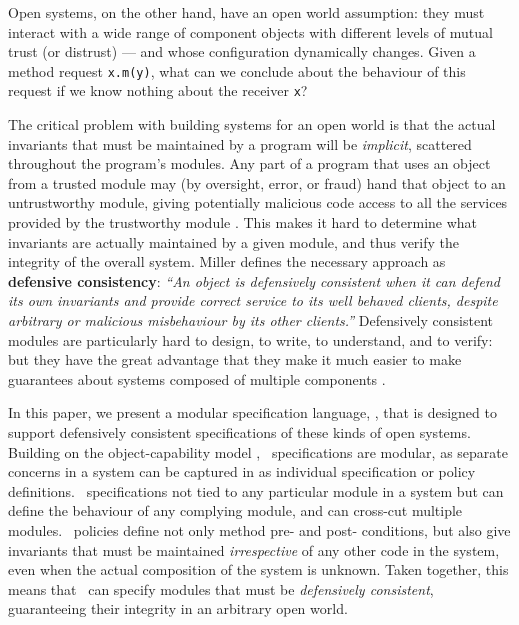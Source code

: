 Open
systems, on the other hand, have an open world assumption: they must
interact with a wide range of component objects with different levels
of mutual trust (or distrust) --- and whose configuration dynamically
changes.
%
%
Given a method request \lstinline+x.m(y)+, what can
we conclude about the behaviour of this request if we know nothing
about the receiver \lstinline+x+?
 

The critical
problem with building systems for an open world is that the actual
invariants that must be maintained by a program will be
\textit{implicit}, scattered throughout the program's modules.  Any
part of a program that uses an object from a trusted module may (by
oversight, error, or fraud) hand that object to an untrustworthy
module, giving potentially malicious code access to all the services
provided by the trustworthy module \cite{geneva91,aliasingBook}.  This
makes it hard to determine what invariants are actually maintained by
a given module, and thus verify the integrity of the overall system.
%
Miller \cite{miller-esop2013,MillerPhD} defines the necessary approach
as \textbf{defensive consistency}: \textit{``An object is defensively
  consistent when it can defend its own invariants and provide correct
  service to its well behaved clients, despite arbitrary or malicious
  misbehaviour by its other clients.''}  Defensively consistent
modules are particularly hard to design, to write, to understand, and
to verify: but they have the great advantage that they make it much
easier to make guarantees about systems composed of multiple components
\cite{Murray:phd}.


In this paper, we present a modular specification language,
\Chainmail, that is designed to support defensively consistent
specifications of these kinds of open
systems. Building on the object-capability model \cite{Elang},
\Chainmail\ specifications are modular, as separate concerns in a
system can be captured in as individual specification or policy
definitions.  \Chainmail\ specifications 
not tied to any particular module in a system but can define
the behaviour of any complying module, and can cross-cut multiple
modules.  \Chainmail\ policies define not only method pre- and post-
conditions, but also give invariants that must be maintained
\emph{irrespective} of any other code in the system, even when the
actual composition of the system is unknown.  Taken together, this
means that \Chainmail\ can specify modules that must be
\emph{defensively consistent}, guaranteeing their integrity in an
arbitrary open world.
  
